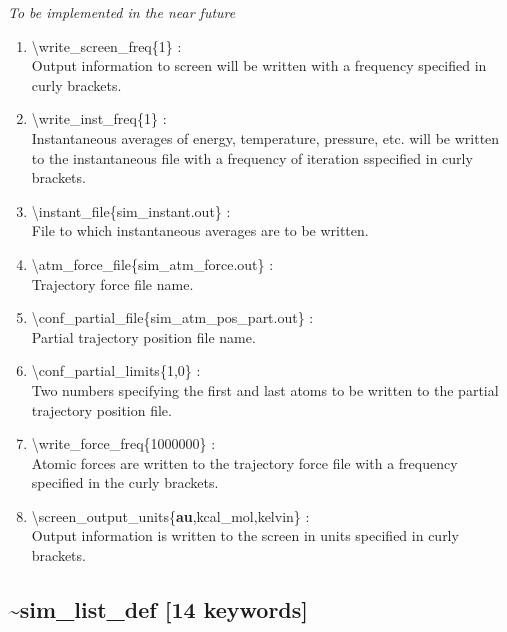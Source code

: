 \documentclass[12pt,titlepage]{article}
\begin{document}
{\it 
To be implemented in the near future
 \vspace{0.15in} 
 \begin{enumerate}
 \item   \textbackslash write\_screen\_freq\{1\} : \\
   Output information to screen will be written with a frequency specified
   in curly brackets.
 \item   \textbackslash write\_inst\_freq\{1\} : \\
     Instantaneous averages of energy, temperature, pressure, etc. will be 
     written to the instantaneous file with a frequency of iteration sspecified in curly 
     brackets.
 \item   \textbackslash instant\_file\{sim\_instant.out\} : \\
     File to which instantaneous averages are to be written.
    
 \item   \textbackslash atm\_force\_file\{sim\_atm\_force.out\} : \\
     Trajectory force file name.

 \item   \textbackslash conf\_partial\_file\{sim\_atm\_pos\_part.out\} : \\
     Partial trajectory position file name.

 \item   \textbackslash conf\_partial\_limits\{1,0\} : \\
   Two numbers specifying the first and last atoms to be written to
   the partial trajectory position file.

 \item   \textbackslash write\_force\_freq\{1000000\} : \\
   Atomic forces are written to the trajectory force file with a
   frequency specified in the curly brackets.

 \item   \textbackslash screen\_output\_units\{{\bf au},kcal\_mol,kelvin\} : \\
   Output information is written to the screen in units specified 
   in curly brackets.

   
\end{enumerate}
}


\newpage
\subsection*{\bf \~{}sim\_list\_def [14 keywords]}
\end{document}
